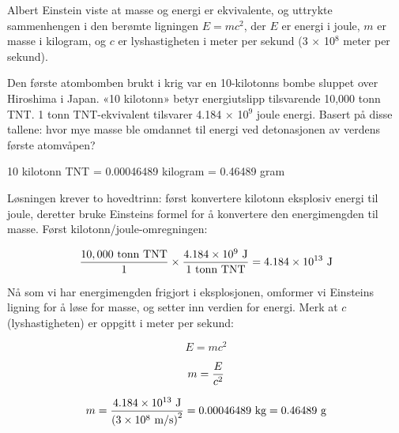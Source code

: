 
Albert Einstein viste at masse og energi er ekvivalente, og uttrykte sammenhengen i den berømte ligningen $E = mc^2$, der $E$ er energi i joule, $m$ er masse i kilogram, og $c$ er lyshastigheten i meter per sekund (3 $\times$ 10$^{8}$ meter per sekund).

Den første atombomben brukt i krig var en 10-kilotonns bombe sluppet over Hiroshima i Japan. «10 kilotonn» betyr energiutslipp tilsvarende 10,000 tonn TNT. 1 tonn TNT-ekvivalent tilsvarer 4.184 $\times$ 10$^{9}$ joule energi. Basert på disse tallene: hvor mye masse ble omdannet til energi ved detonasjonen av verdens første atomvåpen?







10 kilotonn TNT = 0.00046489 kilogram = 0.46489 gram

\vskip 10pt

Løsningen krever to hovedtrinn: først konvertere kilotonn eksplosiv energi til joule, deretter bruke Einsteins formel for å konvertere den energimengden til masse. Først kilotonn/joule-omregningen:

$${10,000 \hbox{ tonn TNT} \over 1} \times {4.184 \times 10^9 \hbox{ J} \over 1 \hbox{ tonn TNT}} = 4.184 \times 10^{13} \hbox{ J}$$

Nå som vi har energimengden frigjort i eksplosjonen, omformer vi Einsteins ligning for å løse for masse, og setter inn verdien for energi. Merk at $c$ (lyshastigheten) er oppgitt i meter per sekund:

$$E = mc^2$$

$$m = {E \over c^2}$$

$$m = {{4.184 \times 10^{13} \hbox{ J}} \over \left({3 \times 10^8 \hbox{ m/s}}\right)^2} = 0.00046489 \hbox{ kg} = 0.46489 \hbox{ g}$$









